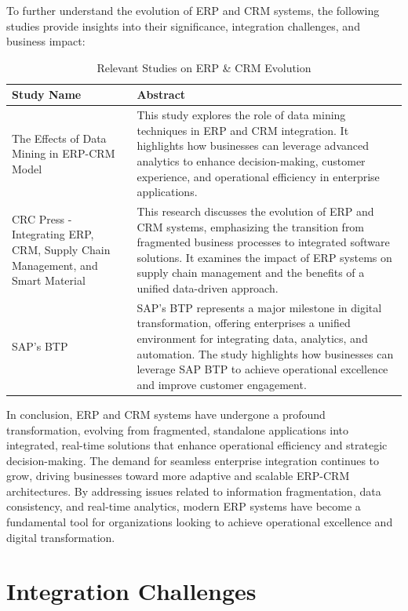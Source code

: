To further understand the evolution of ERP and CRM systems, the following studies provide insights into their significance, integration challenges, and business impact:

\begin{table}[h]
\centering
\begin{tabular}{|p{5cm}|p{10cm}|}
\hline
Study Name & Abstract \\ 
\hline
The Effects of Data Mining in ERP-CRM Model & This study explores the role of data mining techniques in ERP and CRM integration. It highlights how businesses can leverage advanced analytics to enhance decision-making, customer experience, and operational efficiency in enterprise applications. \\ 
\hline
CRC Press - Integrating ERP, CRM, Supply Chain Management, and Smart Material & This research discusses the evolution of ERP and CRM systems, emphasizing the transition from fragmented business processes to integrated software solutions. It examines the impact of ERP systems on supply chain management and the benefits of a unified data-driven approach. \\ 
\hline
SAP’s BTP & SAP’s BTP represents a major milestone in digital transformation, offering enterprises a unified environment for integrating data, analytics, and automation. The study highlights how businesses can leverage SAP BTP to achieve operational excellence and improve customer engagement. \\ 
\hline
\end{tabular}
\caption{Relevant Studies on ERP \& CRM Evolution}
\label{table:erp_crm_studies}
\end{table}

In conclusion, ERP and CRM systems have undergone a profound transformation, evolving from fragmented, standalone applications into integrated, real-time solutions that enhance operational efficiency and strategic decision-making. The demand for seamless enterprise integration continues to grow, driving businesses toward more adaptive and scalable ERP-CRM architectures. By addressing issues related to information fragmentation, data consistency, and real-time analytics, modern ERP systems have become a fundamental tool for organizations looking to achieve operational excellence and digital transformation.  

\section{Integration Challenges}
